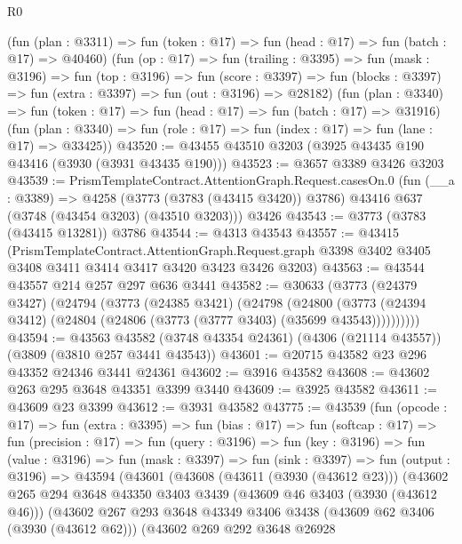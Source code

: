 \begin{lexlean}{R0}
\begin{coremodule}
      (fun (plan : @3311) => fun (token : @17) => fun (head : @17) => fun (batch : @17) => @40460)
      (fun (op : @17) =>
      fun (trailing : @3395) =>
      fun (mask : @3196) =>
      fun (top : @3196) =>
      fun (score : @3397) =>
      fun (blocks : @3397) => fun (extra : @3397) => fun (out : @3196) => @28182)
      (fun (plan : @3340) => fun (token : @17) => fun (head : @17) => fun (batch : @17) => @31916)
      (fun (plan : @3340) => fun (role : @17) => fun (index : @17) => fun (lane : @17) => @33425))
@43520 := @43455 @43510 @3203 (@3925 @43435 @190 @43416 (@3930 (@3931 @43435 @190)))
@43523 := @3657 @3389 @3426 @3203
@43539 := PrismTemplateContract.AttentionGraph.Request.casesOn.{0}
    (fun (__a : @3389) =>
    @4258 (@3773 (@3783 (@43415 @3420)) @3786) @43416 @637 (@3748 (@43454 @3203) (@43510 @3203)))
    @3426
@43543 := @3773 (@3783 (@43415 @13281)) @3786
@43544 := @4313 @43543
@43557 := @43415
    (PrismTemplateContract.AttentionGraph.Request.graph
      @3398
      @3402
      @3405
      @3408
      @3411
      @3414
      @3417
      @3420
      @3423
      @3426
      @3203)
@43563 := @43544 @43557 @214 @257 @297 @636 @3441
@43582 := @30633
    (@3773
      (@24379 @3427)
      (@24794
        (@3773
          (@24385 @3421)
          (@24798
            (@24800
              (@3773 (@24394 @3412) (@24804 (@24806 (@3773 (@3777 @3403) (@35699 @43543))))))))))
@43594 := @43563
    @43582
    (@3748 @43354 @24361)
    (@4306 (@21114 @43557))
    (@3809 (@3810 @257 @3441 @43543))
@43601 := @20715 @43582 @23 @296 @43352 @24346 @3441 @24361
@43602 := @3916 @43582
@43608 := @43602 @263 @295 @3648 @43351 @3399 @3440
@43609 := @3925 @43582
@43611 := @43609 @23 @3399
@43612 := @3931 @43582
@43775 := @43539
    (fun (opcode : @17) =>
    fun (extra : @3395) =>
    fun (bias : @17) =>
    fun (softcap : @17) =>
    fun (precision : @17) =>
    fun (query : @3196) =>
    fun (key : @3196) =>
    fun (value : @3196) =>
    fun (mask : @3397) =>
    fun (sink : @3397) =>
    fun (output : @3196) =>
    @43594
      (@43601
        (@43608
          (@43611 (@3930 (@43612 @23)))
          (@43602
            @265
            @294
            @3648
            @43350
            @3403
            @3439
            (@43609 @46 @3403 (@3930 (@43612 @46)))
            (@43602
              @267
              @293
              @3648
              @43349
              @3406
              @3438
              (@43609 @62 @3406 (@3930 (@43612 @62)))
              (@43602
                @269
                @292
                @3648
                @26928

\end{coremodule}
\end{lexlean}
